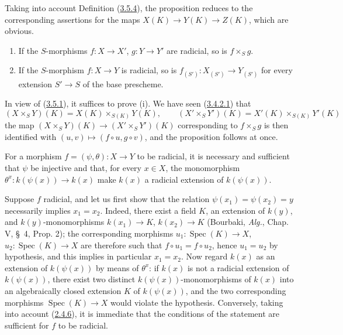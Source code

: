 Taking into account Definition (\hyperref[I.3.5.4]{3.5.4}), the proposition
reduces to the corresponding assertions for the maps
$X(K)\to Y(K)\to Z(K)$, which are obvious.

\begin{proposition}[3.5.7]
\label{I.3.5.7}
\begin{enumerate}
  \item[(i)] If the $S$-morphisms $f:X\to X'$, $g:Y\to Y'$ are radicial,
  so is $f\times_S g$.
  \item[(ii)] If the $S$-morphism $f:X\to Y$ is radicial, so is
  $f_{(S')}:X_{(S')}\to Y_{(S')}$ for every extension $S'\to S$ of the
  base prescheme.
\end{enumerate}
\end{proposition}

In view of (\hyperref[I.3.5.1]{3.5.1}), it suffices to prove (i). We have
seen (\hyperref[I.3.4.2.1]{3.4.2.1}) that
\label{I.3.5.7.field-valued-product}
\[
  (X\times_S Y)(K)=X(K)\times_{S(K)}Y(K),\qquad
  (X'\times_S Y')(K)=X'(K)\times_{S(K)}Y'(K)
\]
the map $(X\times_S Y)(K)\to(X'\times_S Y')(K)$ corresponding to
$f\times_S g$ is then identified with $(u,v)\mapsto(f\circ u,g\circ v)$, and
the proposition follows at once.

\begin{proposition}[3.5.8]
\label{I.3.5.8}
For a morphism $f=(\psi,\theta):X\to Y$ to be radicial, it is necessary and
sufficient that $\psi$ be injective and that, for every $x\in X$, the
monomorphism $\theta^x:k(\psi(x))\to k(x)$ make $k(x)$ a radicial extension of
$k(\psi(x))$.
\end{proposition}

Suppose $f$ radicial, and let us first show that the relation
$\psi(x_1)=\psi(x_2)=y$ necessarily implies $x_1=x_2$. Indeed, there
exist a field $K$, an extension of $k(y)$, and $k(y)$-monomorphisms
$k(x_1)\to K$, $k(x_2)\to K$ (Bourbaki, \emph{Alg.}, Chap. V, \S~4,
Prop. 2); the corresponding morphisms
$u_1:\operatorname{Spec}(K)\to X$, $u_2:\operatorname{Spec}(K)\to X$ are
therefore such that $f\circ u_1=f\circ u_2$, hence $u_1=u_2$ by hypothesis,
and this implies in particular $x_1=x_2$. Now regard $k(x)$ as an
extension of $k(\psi(x))$ by means of $\theta^x$: if $k(x)$ is not a
radicial extension of $k(\psi(x))$, there exist two distinct
$k(\psi(x))$-monomorphisms of $k(x)$ into an algebraically
closed extension $K$ of $k(\psi(x))$, and the two corresponding morphisms
$\operatorname{Spec}(K)\to X$ would violate the hypothesis. Conversely, taking
into account (\hyperref[I.2.4.6]{2.4.6}), it is immediate that the
conditions of the statement are sufficient for $f$ to be radicial.


